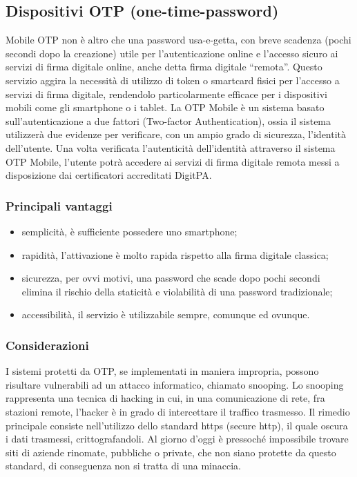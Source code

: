\subsection{Dispositivi OTP (one-time-password)}

Mobile OTP non è altro che una password usa-e-getta, con breve scadenza (pochi secondi dopo la creazione) utile per l’autenticazione online e l’accesso sicuro ai servizi di firma digitale online, anche detta firma digitale “remota”.
Questo servizio aggira la necessità di utilizzo di token o smartcard fisici per l’accesso a servizi di firma digitale, rendendolo particolarmente efficace per i dispositivi mobili come gli smartphone o i tablet.
La OTP Mobile è un sistema basato sull’autenticazione a due fattori (Two-factor Authentication), ossia il sistema utilizzerà due evidenze per verificare, con un ampio grado di sicurezza, l’identità dell’utente.  Una volta verificata l’autenticità dell’identità attraverso il sistema OTP Mobile, l’utente potrà accedere ai servizi di firma digitale remota messi a disposizione dai certificatori accreditati DigitPA.
\subsubsection{Principali vantaggi}
\begin{itemize}
	\item semplicità, è sufficiente possedere uno smartphone;
	\item rapidità, l'attivazione è molto rapida rispetto alla firma digitale classica;
	\item sicurezza, per ovvi motivi, una password che scade dopo pochi secondi elimina il rischio della staticità e violabilità di una password tradizionale;
	\item accessibilità, il servizio è utilizzabile sempre, comunque ed ovunque.
\end{itemize}

\subsubsection{Considerazioni}
I sistemi protetti da OTP, se implementati in maniera impropria, possono risultare vulnerabili ad un attacco informatico, chiamato snooping. Lo snooping rappresenta una tecnica di hacking in cui, in una comunicazione di rete, fra stazioni remote, l'hacker è in grado di intercettare il traffico trasmesso. Il rimedio principale consiste nell'utilizzo dello standard https (secure http), il quale oscura i dati trasmessi, crittografandoli. Al giorno d'oggi è pressoché impossibile trovare siti di aziende rinomate, pubbliche o private, che non siano protette da questo standard, di conseguenza non si tratta di una minaccia. 

